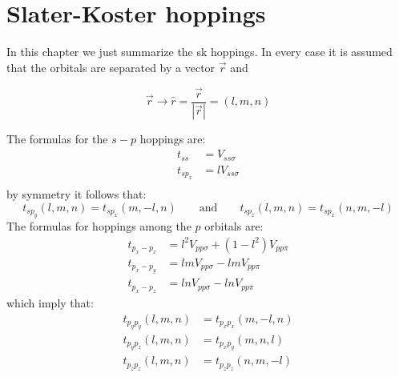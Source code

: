 \chapter{Slater-Koster hoppings}
\label{SKhoppings}
In this chapter we just summarize the \ac{sk} hoppings. In every case it is assumed that the orbitals are separated by a vector $\vec{r}$ and

\begin{equation*}
  \vec{r} \longrightarrow \hat{r}=\frac{\vec{r}}{|\vec{r}|} = (l,m,n)
\end{equation*}

The formulas for the $s-p$ hoppings are:
\begin{equation}
\begin{split}
  t_{ss} &= V_{ss\sigma}\\
  t_{sp_x} &= l V_{ss\sigma}\\
\end{split}
\end{equation}
by symmetry it follows that:
\begin{equation}
   t_{sp_y}(l,m,n) = t_{sp_x}(m,-l,n) \qquad \text{and} \qquad
   t_{sp_z}(l,m,n) = t_{sp_x}(n,m,-l)
\end{equation}
The formulas for hoppings among the $p$ orbitals are:
\begin{equation}
\begin{split}
  t_{p_x-p_x} &= l^2 V_{pp\sigma} + \left(1-l^2\right) V_{pp\pi}\\
  t_{p_x-p_y} &= lm V_{pp\sigma} - lm V_{pp\pi}\\
  t_{p_x-p_z} &= ln V_{pp\sigma} - ln V_{pp\pi}
\end{split}
\end{equation}
which imply that:
\begin{equation}
\begin{split}
   t_{p_yp_y}(l,m,n) &= t_{p_xp_x}(m,-l,n) \\
   t_{p_yp_z}(l,m,n) &= t_{p_xp_y}(m,n,l) \\
   t_{p_zp_z}(l,m,n) &= t_{p_zp_z}(n,m,-l)
\end{split}
\end{equation}

